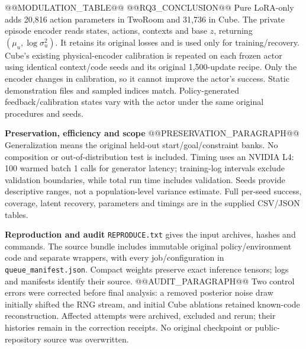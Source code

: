 \documentclass[11pt,a4paper]{article}
\newcommand{\topic}[1]{\par\smallskip\textbf{#1}\quad}
\begin{document}
@@MODULATION_TABLE@@
@@RQ3_CONCLUSION@@
Pure LoRA-only adds 20,816 action parameters in TwoRoom and 31,736 in Cube.
The private episode encoder reads states, actions, contexts and base $z$,
returning $(\mu_u,\log\sigma_u^2)$. It retains its original losses and is used
only for training/recovery. Cube's existing physical-encoder calibration is
repeated on each frozen actor using identical context/code seeds and its original
1,500-update recipe. Only the encoder changes in calibration, so it cannot improve
the actor's success. Static demonstration files and sampled indices match.
Policy-generated feedback/calibration states vary with the actor under the
same original procedures and seeds.

\topic{Preservation, efficiency and scope}
@@PRESERVATION_PARAGRAPH@@
Generalization means the original held-out start/goal/constraint banks.
No composition or out-of-distribution test is included.
Timing uses an NVIDIA L4: 100 warmed batch 1 calls for generator latency;
training-log intervals exclude validation boundaries, while total run time
includes validation. Seeds provide descriptive ranges, not a population-level
variance estimate. Full per-seed success, coverage, latent recovery, parameters
and timings are in the supplied CSV/JSON tables.

\topic{Reproduction and audit}
\texttt{REPRODUCE.txt} gives the input archives, hashes and commands. The source
bundle includes immutable original policy/environment code and separate wrappers,
with every job/configuration in \texttt{queue\_manifest.json}. Compact weights
preserve exact inference tensors; logs and manifests identify their source.
@@AUDIT_PARAGRAPH@@
Two control errors were corrected before final analysis: a removed posterior
noise draw initially shifted the RNG stream, and initial Cube ablations retained
known-code reconstruction. Affected attempts were archived, excluded and rerun;
their histories remain in the correction receipts. No original checkpoint or
public-repository source was overwritten.
\end{document}
